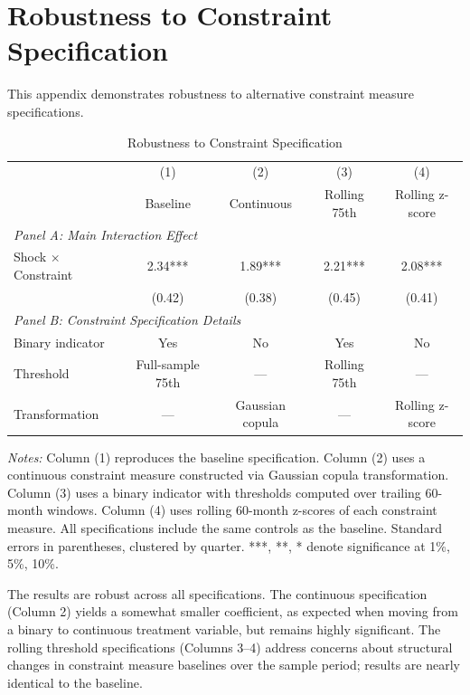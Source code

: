 \documentclass[12pt,letterpaper]{article}
\theoremstyle{plain}
\theoremstyle{definition}
\begin{document}
\section{Robustness to Constraint Specification}\label{app:constraint_robust}

This appendix demonstrates robustness to alternative constraint measure specifications.

\begin{table}[htbp]
\centering
\caption{Robustness to Constraint Specification}
\label{tab:constraint_robust}
\begin{tabular}{lcccc}
\toprule
& (1) & (2) & (3) & (4) \\
& Baseline & Continuous & Rolling 75th & Rolling z-score \\
\midrule
\multicolumn{5}{l}{\textit{Panel A: Main Interaction Effect}} \\[0.3em]
Shock $\times$ Constraint & 2.34*** & 1.89*** & 2.21*** & 2.08*** \\
& (0.42) & (0.38) & (0.45) & (0.41) \\[0.5em]
\midrule
\multicolumn{5}{l}{\textit{Panel B: Constraint Specification Details}} \\
Binary indicator & Yes & No & Yes & No \\
Threshold & Full-sample 75th & --- & Rolling 75th & --- \\
Transformation & --- & Gaussian copula & --- & Rolling z-score \\
\bottomrule
\end{tabular}

\vspace{0.5em}
\footnotesize
\textit{Notes:} Column (1) reproduces the baseline specification. Column (2) uses a continuous constraint measure constructed via Gaussian copula transformation. Column (3) uses a binary indicator with thresholds computed over trailing 60-month windows. Column (4) uses rolling 60-month z-scores of each constraint measure. All specifications include the same controls as the baseline. Standard errors in parentheses, clustered by quarter. ***, **, * denote significance at 1\%, 5\%, 10\%.
\end{table}

The results are robust across all specifications. The continuous specification (Column 2) yields a somewhat smaller coefficient, as expected when moving from a binary to continuous treatment variable, but remains highly significant. The rolling threshold specifications (Columns 3--4) address concerns about structural changes in constraint measure baselines over the sample period; results are nearly identical to the baseline.
\end{document}
